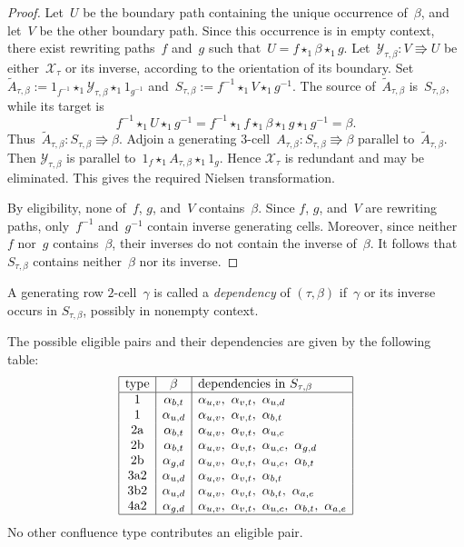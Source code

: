 \documentclass[a4paper, twoside, 11pt, english]{article}
\begin{document}
\begin{proof}
Let~$U$ be the boundary path containing the unique occurrence
of~$\beta$, and let~$V$ be the other boundary path. Since this
occurrence is in empty context, there exist rewriting paths~$f$ and~$g$
such that~$U=f\star_1\beta\star_1g$.
Let~$\mathcal Y_{\tau,\beta}\colon V\Rrightarrow U$
be either~$\mathcal X_\tau$ or its inverse, according to the
orientation of its boundary. Set~$
\widetilde A_{\tau,\beta}
:=
1_{f^{-1}}
\star_1
\mathcal Y_{\tau,\beta}
\star_1
1_{g^{-1}}$
and~$
S_{\tau,\beta}
:=
f^{-1}\star_1V\star_1g^{-1}$.
The source of~$\widetilde A_{\tau,\beta}$ is~$S_{\tau,\beta}$, while
its target is
\[
f^{-1}\star_1U\star_1g^{-1}
=
f^{-1}\star_1f\star_1
\beta
\star_1g\star_1g^{-1}
=
\beta.
\]
Thus~$\widetilde A_{\tau,\beta}\colon
S_{\tau,\beta}\Rrightarrow\beta$.
Adjoin a generating $3$-cell~$A_{\tau,\beta}\colon
S_{\tau,\beta}\Rrightarrow\beta$ parallel to~$\widetilde A_{\tau,\beta}$. Then
$\mathcal Y_{\tau,\beta}$ is parallel to~$1_f\star_1A_{\tau,\beta}\star_1 1_g$.
Hence $\mathcal X_\tau$ is redundant and may be eliminated. This gives
the required Nielsen transformation.

By eligibility, none of~$f$, $g$, and~$V$ contains~$\beta$. Since
$f$, $g$, and~$V$ are rewriting paths, only~$f^{-1}$ and~$g^{-1}$
contain inverse generating cells. Moreover, since neither~$f$ nor~$g$
contains~$\beta$, their inverses do not contain the inverse of~$\beta$.
It follows that~$S_{\tau,\beta}$ contains neither~$\beta$ nor its
inverse.
\end{proof}

A generating row $2$-cell~$\gamma$ is called a \emph{dependency} of
$(\tau,\beta)$ if~$\gamma$ or its inverse occurs in
$S_{\tau,\beta}$, possibly in nonempty context.

\begin{proposition}
\label{P:ExactNielsenSourcesByCase}
The possible eligible pairs and their dependencies are given by the
following table:
\[
\begin{array}{|c|c|l|}
\hline
\text{type}
& \beta
& \text{dependencies in }S_{\tau,\beta}
\\ \hline
1
& \alpha_{b,t}
& \alpha_{u,v},\ \alpha_{v,t},\ \alpha_{u,d}
\\
1
& \alpha_{u,d}
& \alpha_{u,v},\ \alpha_{v,t},\ \alpha_{b,t}
\\
2\mathrm a
& \alpha_{b,t}
& \alpha_{u,v},\ \alpha_{v,t},\ \alpha_{u,c}
\\
2\mathrm b
& \alpha_{b,t}
& \alpha_{u,v},\ \alpha_{v,t},\ \alpha_{u,c},\ \alpha_{g,d}
\\
2\mathrm b
& \alpha_{g,d}
& \alpha_{u,v},\ \alpha_{v,t},\ \alpha_{u,c},\ \alpha_{b,t}
\\
3\mathrm{a2}
& \alpha_{u,d}
& \alpha_{u,v},\ \alpha_{v,t},\ \alpha_{b,t}
\\
3\mathrm{b2}
& \alpha_{u,d}
& \alpha_{u,v},\ \alpha_{v,t},\ \alpha_{b,t},\ \alpha_{a,e}
\\
4\mathrm{a2}
& \alpha_{g,d}
& \alpha_{u,v},\ \alpha_{v,t},\ \alpha_{u,c},\ \alpha_{b,t},\
  \alpha_{a,e}
\\ \hline
\end{array}
\]
No other confluence type contributes an eligible pair.
\end{proposition}
\end{document}
